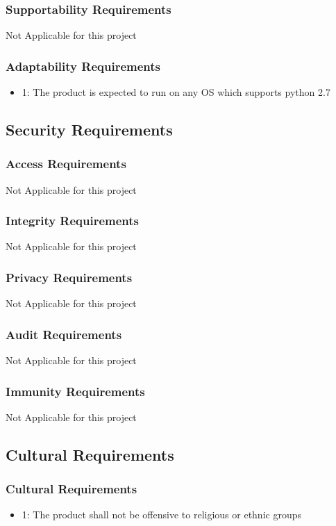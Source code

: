 \documentclass[12pt]{article}
\begin{document}
\subsubsection*{Supportability Requirements}
Not Applicable for this project

\subsubsection*{Adaptability Requirements}
\begin{itemize}
\item 1: The product is expected to run on any OS which supports python 2.7
\end{itemize}

\subsection{Security Requirements}

\subsubsection*{Access Requirements}
Not Applicable for this project
\subsubsection*{Integrity Requirements}
Not Applicable for this project
\subsubsection*{Privacy Requirements}
Not Applicable for this project
\subsubsection*{Audit Requirements}
Not Applicable for this project
\subsubsection*{Immunity Requirements}
Not Applicable for this project

\subsection{Cultural Requirements}

\subsubsection*{Cultural Requirements}
\begin{itemize}
\item 1: The product shall not be offensive to religious or ethnic groups
\end{itemize}
\end{document}
